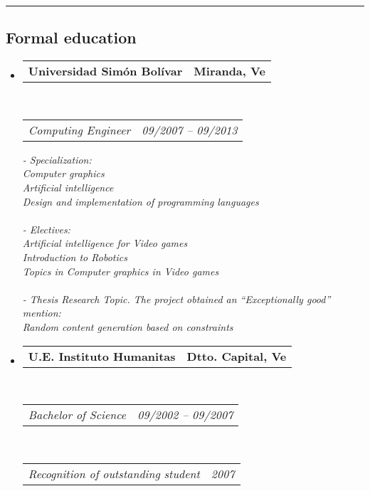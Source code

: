 \documentclass[10pt,letterpaper]{article}
\makeatletter
\newcommand{\headerrow}[2]
{\begin{tabular*}{\linewidth}{l@{\extracolsep{\fill}}r}
	#1 &
	#2 \\
\end{tabular*}}
\makeatother
\begin{document}

\hrule
\vspace{-0.4em}
\subsection*{Formal education}

\begin{itemize}
	\parskip=0.1em

\item 
   \headerrow
   {\textbf{Universidad Simón Bolívar}}
   {\textbf{Miranda, Ve}}
	\\
	\headerrow
   {\emph{Computing Engineer}}
   {\emph{09/2007 -- 09/2013}}
   
   
   {\emph{- Specialization:}}
   \\
   {\emph{     Computer graphics}}
   \\
   {\emph{     Artificial intelligence}}
   \\
   {\emph{     Design and implementation of programming languages}}
   \\
   \\
   {\emph{- Electives:}}
   \\
   {\emph{     Artificial intelligence for Video games}}
   \\
   {\emph{     Introduction to Robotics}}
   \\
   {\emph{     Topics in Computer graphics in Video games}}
   \\
   \\
   {\emph{- Thesis Research Topic. The project obtained an “Exceptionally good” mention:}}
   \\
   {\emph{     Random content generation based on constraints}}

 \item 
   \headerrow
   {\textbf{U.E. Instituto Humanitas}}
   {\textbf{Dtto. Capital, Ve}}
	\\
	\headerrow
   {\emph{Bachelor of Science}}
   {\emph{09/2002 -- 09/2007}}
	\\
	\headerrow
   {\emph{Recognition of outstanding student}}
   {\emph{2007}}
\end{itemize}

\end{document}
